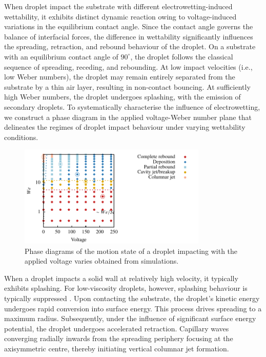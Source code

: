 \documentclass[lineno]{cls/jfm}
\begin{document}
When droplet impact the substrate with different electrowetting-induced wettability, it exhibits distinct dynamic reaction owing to voltage-induced variations in the equilibrium contact angle. Since the contact angle governs the balance of interfacial forces, the difference in wettability significantly influences the spreading, retraction, and rebound behaviour of the droplet. On a substrate with an equilibrium contact angle of $90^\circ$, the droplet follows the classical sequence of spreading, receding, and rebounding. At low impact velocities (i.e., low Weber numbers), the droplet may remain entirely separated from the substrate by a thin air layer, resulting in non-contact bouncing. At sufficiently high Weber numbers, the droplet undergoes splashing, with the emission of secondary droplets. To systematically characterise the influence of electrowetting, we construct a phase diagram in the applied voltage-Weber number plane that delineates the regimes of droplet impact behaviour under varying wettability conditions. 

 \begin{figure}
  \centerline{\includegraphics[width=0.8\textwidth]{fig/phase.pdf}}
  \caption{Phase diagrams of the motion state of a droplet impacting with the applied voltage varies obtained from simulations.}
 \label{fig:mesh}
 \end{figure}
 
 When a droplet impacts a solid wall at relatively high velocity, it typically exhibits splashing. For low-viscosity droplets, however, splashing behaviour is typically suppressed \citep{jian_two_2018}. Upon contacting the substrate, the droplet's kinetic energy undergoes rapid conversion into surface energy. This process drives spreading to a maximum radius. Subsequently, under the influence of significant surface energy potential, the droplet undergoes accelerated retraction. Capillary waves converging radially inwards from the spreading periphery focusing at the axisymmetric centre, thereby initiating vertical columnar jet formation. 
\end{document}
